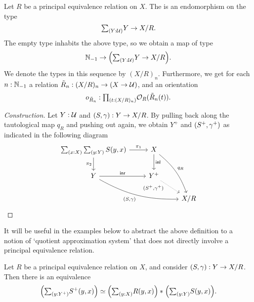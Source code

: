 \begin{defn}\label{defn:qac}
Let $R$ be a principal equivalence relation on $X$. The  is an endomorphism on the type
\begin{equation*}
\sm{Y:\UU} Y\to X/R.
\end{equation*}
The empty type inhabits the above type, so we obtain a map of type
\begin{equation*}
\N_{-1}\to\Big(\sm{Y:\UU} Y\to X/R\Big).
\end{equation*}
We denote the types in this sequence by $(X/R)_n$. Furthermore, we get for each $n:\mathbb{N}_{-1}$ a relation $\tilde{R}_n:(X/R)_n\to (X\to\mathcal{U})$, and an orientation
\begin{equation*}
o_{\tilde{R}_n}:\prd{t:(X/R)_n} \mathcal{O}_R(\tilde{R}_n(t)).
\end{equation*}
\end{defn}

\begin{proof}[Construction]
Let $Y:\mathcal{U}$ and ${\mathopen{}(S,\gamma)\mathclose{}}:Y\to X/R$. By pulling back along the tautological map $q_R$ and pushing out again, we obtain $Y^+$ and ${\mathopen{}(S^+,\gamma^+)\mathclose{}}$ as indicated in the following diagram
\begin{equation*}
\begin{tikzcd}
\sm{x:X}{y:Y}S(y,x) \arrow[r,"\pi_1"] \arrow[d,swap,"\pi_2"] & X \arrow[d,"\inl"] \arrow[ddr,bend left=15,"q_R"] \\
Y \arrow[r,"\inr"] \arrow[drr,bend right=15,swap,"{\pairr{S,\gamma}}"] & Y^+ \arrow[dr,densely dotted,near start,swap,"{\pairr{S^+,\gamma^+}}"] \\
& & X/R
\end{tikzcd}
\end{equation*}
\end{proof}

It will be useful in the examples below to abstract the above definition to a notion of `quotient approximation system' that does not directly involve a principal equivalence relation. 

\begin{thm}\label{thm:iteratedjoin}
Let $R$ be a principal equivalence relation on $X$, and consider ${\mathopen{}(S,\gamma)\mathclose{}}:Y\to X/R$. Then there is an equivalence
\begin{equation*}
\eqv{\Big(\sm{y:Y^+}S^+(y,x)\Big)}{\join{\Big(\sm{y:X}R(y,x)\Big)}{\Big(\sm{y:Y}S(y,x)\Big)}}.
\end{equation*}
\end{thm}

